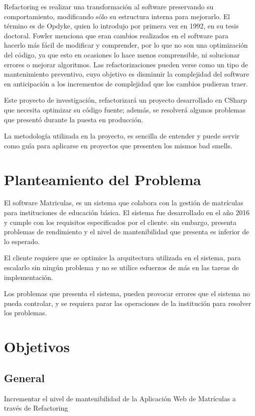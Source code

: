 Refactoring es realizar una  transformación al software preservando su comportamiento, modificando sólo su estructura interna para mejorarlo. El término es de Opdyke, quien lo introdujo por primera vez en 1992, en su tesis doctoral. Fowler menciona que eran cambios realizados en el software para hacerlo más fácil de modificar y comprender, por lo que no son una optimización del código, ya que esto en ocasiones lo hace menos comprensible, ni solucionar errores o mejorar algoritmos. Las refactorizaciones pueden verse como un tipo de mantenimiento preventivo, cuyo objetivo es disminuir la complejidad del software en anticipación a los incrementos de complejidad que los cambios pudieran traer.

Este proyecto de investigación, refactorizará un proyecto desarrollado en CSharp que necesita optimizar su código fuente; además, se resolverá algunos problemas que presentó durante la puesta en producción.

La metodología utilizada en la proyecto, es sencilla de entender y puede servir como guía para aplicarse en proyectos que presenten los mismos bad smells.

\section{Planteamiento del Problema}

El software Matriculas, es un sistema que colabora con la gestión de matrículas para instituciones de educación básica. El sistema fue desarrollado en el año 2016 y cumple con los requisitos especificados por el cliente. sin embargo, presenta problemas de rendimiento y el nivel de mantenibilidad que presenta es inferior de lo esperado.

El cliente requiere que se optimice la arquitectura utilizada en el sistema, para escalarlo sin ningún problema y no se utilice esfuerzos de más en las tareas de implementación.

Los problemas que presenta el sistema, pueden provocar errores que el sistema no pueda controlar, y se requiera parar las operaciones de la institución para resolver los problemas.

\section{Objetivos}

\subsection{General}
Incrementar el nivel de mantenibilidad de la Aplicación Web de Matrículas a través de Refactoring

